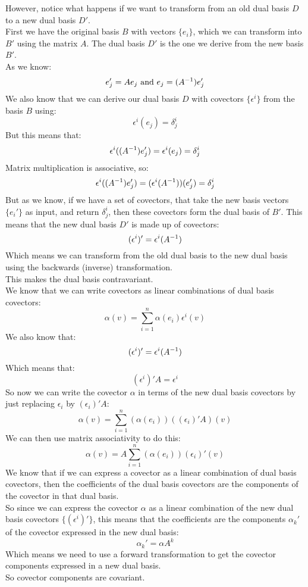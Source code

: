 \documentclass[12pt]{article}
\begin{document}
However, notice what happens if we want to
transform from an old dual basis $D$ to a
new dual basis $D'$. \\
First we have the original basis $B$
with vectors $\{e_i\}$,
which we can transform into $B'$
using the matrix $A$.
The dual basis $D'$ is the one we derive
from the new basis $B'$. \\
As we know:
\[ e_j' = Ae_j 
\text{ and } e_j = (A^{-1})e_j' \]
We also know that we can derive our dual basis
$D$ with covectors $\{\epsilon^i\}$
from the basis $B$ using:
\[ \epsilon^i(e_j) = \delta_j^i \]
But this means that:
\[ \epsilon^i((A^{-1}) e_j')
= \epsilon^i(e_j) = \delta_j^i \]
Matrix multiplication is associative, so:
\[ \epsilon^i((A^{-1}) e_j')
=  (\epsilon^i(A^{-1}))(e_j') 
= \delta_j^i \]
But as we know, if we have a set of covectors,
that take the new basis vectors $\{ e_i' \}$
as input, and return $\delta_j^i$,
then these covectors form the dual basis of $B'$.
This means that the new dual basis $D'$
is made up of covectors:
\[ (\epsilon^i)' = \epsilon^i(A^{-1}) \]
Which means we can transform from the old
dual basis to the new dual basis
using the backwards (inverse) transformation. \\
This makes the dual basis contravariant. \\

We know that we can write covectors
as linear combinations of dual basis
covectors:
\[ \alpha(v) = \sum_{i = 1}^{n} 
\alpha(e_i)\epsilon^i(v) \]
We also know that:
\[ (\epsilon^i)' = \epsilon^i(A^{-1}) \]
Which means that:
\[ (\epsilon^i)'A = \epsilon^i \]
So now we can write the covector $\alpha$
in terms of the new dual basis covectors
by just replacing $\epsilon_i$
by $(\epsilon_i)'A$:
\[ \alpha(v) 
= \sum_{i = 1}^{n} (\alpha(e_i))((\epsilon_i)'A)(v) \]
We can then use matrix associativity to do this:
\[ \alpha(v) = 
A\sum_{i = 1}^{n} (\alpha(e_i))(\epsilon_i)'(v) \]
We know that if we can express a covector
as a linear combination of dual basis covectors,
then the coefficients of the dual basis covectors
are the components of the covector in that dual
basis. \\

So since we can express the covector $\alpha$
as a linear combination of the new dual basis
covectors $\{ (\epsilon^i)' \}$,
this means that the coefficients are the
components $\alpha_k'$ of the covector
expressed in the new dual basis:
\[ \alpha_k' = \alpha A^k \]
Which means we need to use a forward
transformation to get the covector components
expressed in a new dual basis. \\
So covector components are covariant. \\
\end{document}
